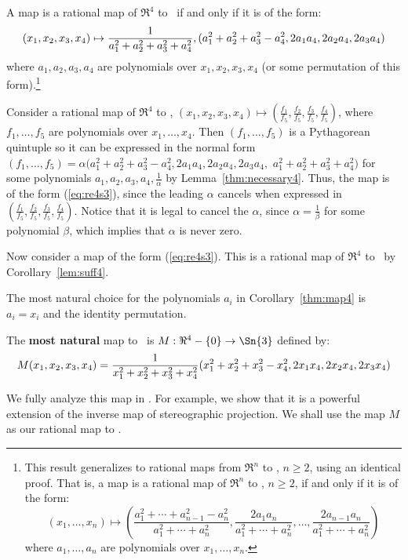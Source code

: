 \begin{corollary}
\label{thm:map4}
A map is a rational map of $\Re^4$ to \ if and only if
it is of the form:
\begin{equation}
\label{eq:re4s3}
\small{(x_1,x_2,x_3,x_4)} \mapsto 
\small{\frac{1}{a_1^2 + a_2^2 + a_3^2 + a_4^2},
	(a_1^2 + a_2^2 + a_3^2 - a_4^2, 2a_1a_4, 2a_2a_4, 2a_3a_4)}
\end{equation}
where $a_1,a_2,a_3,a_4$ are polynomials over $x_1,x_2,x_3,x_4$
(or some permutation of this form).\footnote{This result generalizes
	to rational maps from $\Re^n$ to , $n \geq 2$,
	using an identical proof.
	That is, a map is a rational map of $\Re^n$ to , $n \geq 2$, 
	if and only if it is of the form:
\[
	(x_1,\ldots,x_n) \mapsto
	(\frac{a_1^2 + \cdots + a_{n-1}^2 - a_n^2}{a_1^2 + \cdots + a_n^2},
	 \frac{2a_1a_n}{a_1^2 + \cdots + a_n^2},
	 \ldots,
	 \frac{2a_{n-1}a_n}{a_1^2 + \cdots + a_n^2})
\]
where $a_1,\ldots,a_n$ are polynomials over $x_1,\ldots,x_n$.}
\end{corollary}
\prf
Consider a rational map
of $\Re^4$ to , $(x_1,x_2,x_3,x_4) \mapsto 
(\frac{f_1}{f_5},\frac{f_2}{f_5},\frac{f_3}{f_5},\frac{f_4}{f_5})$,
where $f_1,\ldots,f_5$ are polynomials over $x_1,\ldots,x_4$.
Then $(f_1,\ldots,f_5)$ is a Pythagorean quintuple
so it can be expressed in the normal form
$(f_1,\ldots,f_5) = \alpha (a_1^2 + a_2^2 + a_3^2 - a_4^2,
2a_1a_4,2a_2a_4,2a_3a_4,$ $a_1^2 + a_2^2 + a_3^2 + a_4^2)$
for some polynomials $a_1,a_2,a_3,a_4,\frac{1}{\alpha}$
by Lemma~\ref{thm:necessary4}.
Thus, the map is of the form (\ref{eq:re4s3}), since the leading $\alpha$
cancels when expressed in 
$(\frac{f_1}{f_5},\frac{f_2}{f_5},\frac{f_3}{f_5},\frac{f_4}{f_5})$.
Notice that it is legal to cancel the $\alpha$, since
$\alpha = \frac{1}{\beta}$ for some polynomial $\beta$,
which implies that $\alpha$ is never zero.

Now consider a map of the form (\ref{eq:re4s3}).
This is a rational map of $\Re^4$ to \ by Corollary~\ref{lem:suff4}.
\QED

\noindent The most natural choice for the polynomials $a_i$ 
in Corollary~\ref{thm:map4} is $a_i = x_i$ and the identity permutation.
%
\begin{defn2}
The {\bf most natural} map to \ is 
$M: \Re^4 - \{0\} \rightarrow \Sn{3}$ defined by:
\begin{equation}
\label{eqM}
\footnotesize{
	M(x_1,x_2,x_3,x_4) =
	\frac{1}{x_1^2 + x_2^2 + x_3^2 + x_4^2}
	(x_1^2 + x_2^2 + x_3^2 - x_4^2, 2x_1x_4, 2x_2x_4, 2x_3x_4)
	 }
\end{equation}
\end{defn2}
%
We fully analyze this map in \cite{jj98b}.
For example, we show that it is a powerful extension of
the inverse map of stereographic projection.
We shall use the map $M$ as our rational map to .

